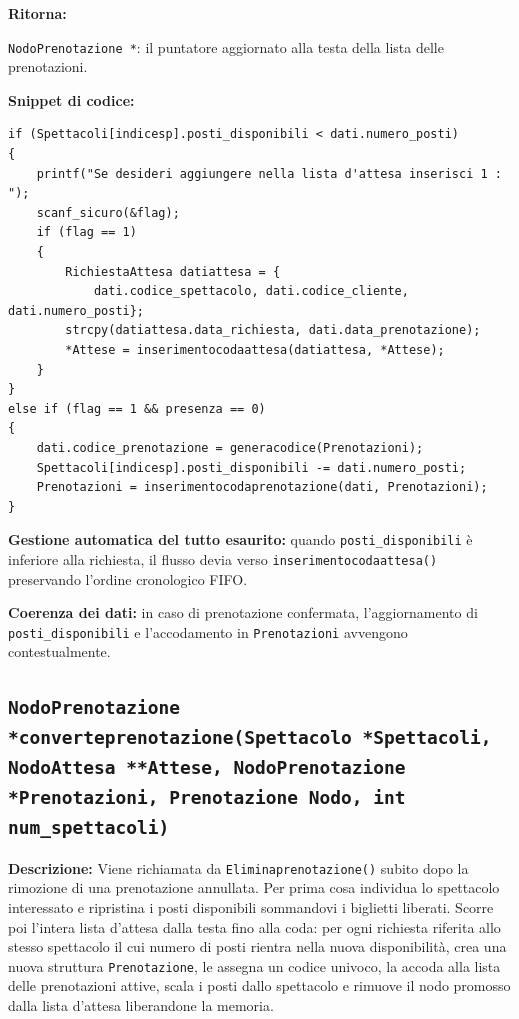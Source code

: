 \documentclass[11pt,a4paper,oneside,openany]{book}
\newenvironment{listacomp}{%
    \small
    \begin{list}{\textendash}{%
        \setlength{\topsep}{2pt}%
        \setlength{\partopsep}{0pt}%
        \setlength{\itemsep}{1pt}%
        \setlength{\parsep}{0pt}%
        \setlength{\leftmargin}{1.2em}%
    }%
}{%
    \end{list}%
}
\begin{document}
\noindent\textbf{Ritorna:}
\begin{listacomp}
    \item \texttt{NodoPrenotazione *}: il puntatore aggiornato alla testa della lista delle prenotazioni.
\end{listacomp}

\noindent\textbf{Snippet di codice:}
\begin{lstlisting}[caption={Smistamento tra lista d'attesa e prenotazione attiva in registraprenotazione()}]
if (Spettacoli[indicesp].posti_disponibili < dati.numero_posti)
{
    printf("Se desideri aggiungere nella lista d'attesa inserisci 1 : ");
    scanf_sicuro(&flag);
    if (flag == 1)
    {
        RichiestaAttesa datiattesa = {
            dati.codice_spettacolo, dati.codice_cliente, dati.numero_posti};
        strcpy(datiattesa.data_richiesta, dati.data_prenotazione);
        *Attese = inserimentocodaattesa(datiattesa, *Attese);
    }
}
else if (flag == 1 && presenza == 0)
{
    dati.codice_prenotazione = generacodice(Prenotazioni);
    Spettacoli[indicesp].posti_disponibili -= dati.numero_posti;
    Prenotazioni = inserimentocodaprenotazione(dati, Prenotazioni);
}
\end{lstlisting}

\begin{listacomp}
    \item \textbf{Gestione automatica del tutto esaurito:} quando \texttt{posti\_disponibili} è inferiore alla richiesta, il flusso devia verso \texttt{inserimentocodaattesa()} preservando l'ordine cronologico FIFO.
    \item \textbf{Coerenza dei dati:} in caso di prenotazione confermata, l'aggiornamento di \texttt{posti\_disponibili} e l'accodamento in \texttt{Prenotazioni} avvengono contestualmente.
\end{listacomp}

\subsection[converteprenotazione()]{\texttt{NodoPrenotazione *converteprenotazione(Spettacolo *Spettacoli, NodoAttesa **Attese, NodoPrenotazione *Prenotazioni, Prenotazione Nodo, int num\_spettacoli)}}

\noindent\textbf{Descrizione:}
Viene richiamata da \texttt{Eliminaprenotazione()} subito dopo la rimozione di una prenotazione annullata. Per prima cosa individua lo spettacolo interessato e ripristina i posti disponibili sommandovi i biglietti liberati. Scorre poi l'intera lista d'attesa dalla testa fino alla coda: per ogni richiesta riferita allo stesso spettacolo il cui numero di posti rientra nella nuova disponibilità, crea una nuova struttura \texttt{Prenotazione}, le assegna un codice univoco, la accoda alla lista delle prenotazioni attive, scala i posti dallo spettacolo e rimuove il nodo promosso dalla lista d'attesa liberandone la memoria.
\end{document}
